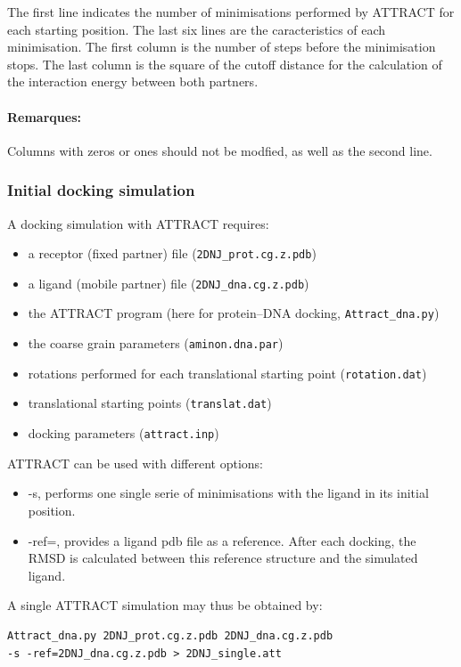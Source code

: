 \documentclass[12pt,a4paper]{article}
\begin{document}
The first line indicates the number of minimisations performed by ATTRACT for each starting position. The last six lines are the caracteristics of each minimisation. The first column is the number of steps before the minimisation stops. The last column is the square of the cutoff distance for the calculation of the interaction energy between both partners.

\paragraph{Remarques:} Columns with zeros or ones should not be modfied, as well as the second line.

\subsubsection{Initial docking simulation}

A docking simulation with ATTRACT requires:
\begin{itemize}
\item a receptor (fixed partner) file ({\tt 2DNJ\_prot.cg.z.pdb})
\item a ligand (mobile partner) file ({\tt 2DNJ\_dna.cg.z.pdb})
\item the ATTRACT program (here for protein--DNA docking, {\tt  Attract\_dna.py})
\item the coarse grain parameters ({\tt aminon.dna.par})
\item rotations performed for each translational starting point ({\tt rotation.dat})
\item translational starting points ({\tt translat.dat})
\item docking parameters ({\tt attract.inp})
\end{itemize}

ATTRACT can be used with different options:
\begin{itemize}
\item -s, performs one single serie of minimisations with the ligand in its initial position.
\item -ref=, provides a ligand pdb file as a reference. After each docking, the RMSD is calculated between this reference structure and the simulated ligand.
\end{itemize}

A single ATTRACT simulation may thus be obtained by:
\begin{verbatim}
Attract_dna.py 2DNJ_prot.cg.z.pdb 2DNJ_dna.cg.z.pdb 
-s -ref=2DNJ_dna.cg.z.pdb > 2DNJ_single.att
\end{verbatim}
\end{document}
